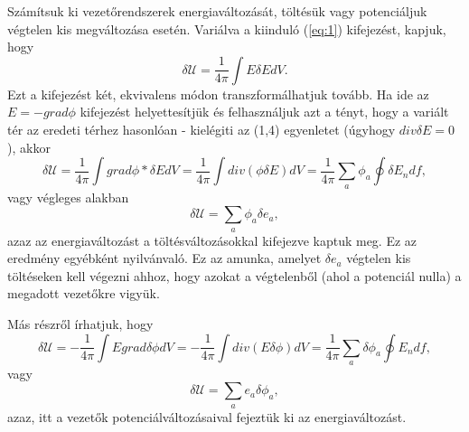 \documentclass{article}
\begin{document}
Számítsuk ki vezetőrendszerek energiaváltozását, töltésük vagy potenciáljuk végtelen kis megváltozása esetén. Variálva a kiinduló (\ref{eq:1}) kifejezést, kapjuk, hogy
\begin{equation} \label{eq:7}
    \delta \mathcal{U} = \frac{1}{4 \pi} \int E \delta EdV .
\end{equation}
Ezt a kifejezést két, ekvivalens módon transzformálhatjuk tovább. Ha ide az $E = -grad\phi$ kifejezést helyettesítjük és felhasználjuk azt a tényt, hogy a variált tér az eredeti térhez hasonlóan - kielégiti az (1,4) egyenletet (úgyhogy $div \delta E = 0$), akkor
\begin{equation} \label{eq:8}
    \delta \mathcal{U} = \frac{1}{4 \pi} \int grad \phi * \delta EdV = \frac{1}{4\pi} \int div(\phi \delta E)dV = \frac{1}{4\pi} \sum\limits_a \phi_a \oint \delta E_n df,
\end{equation}
vagy végleges alakban
\begin{equation} \label{eq:9}
    \delta \mathcal{U} = \sum\limits_a \phi_a \delta e_a ,
\end{equation}
azaz az energiaváltozást a töltésváltozásokkal kifejezve kaptuk meg. Ez az eredmény egyébként nyilvánvaló. Ez az amunka, amelyet $\delta e_a$ végtelen kis töltéseken kell végezni ahhoz, hogy azokat a végtelenből (ahol a potenciál nulla) a megadott vezetőkre vigyük.

Más részről írhatjuk, hogy
\begin{equation} \label{eq:10}
    \delta \mathcal{U} = -\frac{1}{4 \pi} \int Egrad \delta \phi dV=-\frac{1}{4 \pi} \int div(E \delta \phi)dV= \frac{1}{4 \pi} \sum\limits_a \delta \phi_a \oint E_n df,
\end{equation}
vagy
\begin{equation} \label{eq:11}
    \delta \mathcal{U} = \sum\limits_a e_a \delta \phi_a ,
\end{equation}
azaz, itt a vezetők potenciálváltozásaival fejeztük ki az energiaváltozást.
\end{document}
